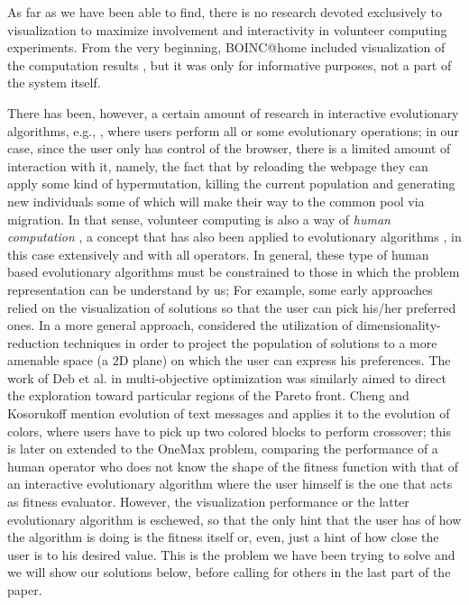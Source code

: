 \documentclass{sig-alternate}
\begin{document}
As far as we have been able to find, there is no research devoted
exclusively to visualization to maximize involvement and interactivity
in volunteer computing experiments. From the very beginning,
BOINC@home included visualization of the computation results
\cite{anderson2006designing}, but it was only for informative
purposes, not a part of the system itself. 

There has been, however, a certain amount of research in interactive
evolutionary algorithms, e.g.,
\cite{takagi01interactive,parmee:human-centric2003,parmee08user-centric,badillo13usercentric},
where users perform all or some evolutionary
operations; in our case, since the
user only has control of the browser, there is a limited amount of
interaction with it, namely, the fact that by reloading the webpage they
can apply some kind of hypermutation, killing the current population and
generating new individuals some of which will make their way to the
common pool via migration. In that sense, volunteer computing is also
a way of {\em human computation} \cite{quinn2011human}, a concept that
has also been applied to evolutionary algorithms \cite{972056, Nickerson2013}, in
this case extensively and with all operators. In general, these type
of human based evolutionary algorithms must be constrained to those in
which the problem representation can be understand by us; 
For example, some early approaches 
\cite{Daw86} relied on the visualization of solutions so that the user can 
pick his/her preferred ones. In a more general approach, \cite{takagi-jcis2000} 
considered the utilization of dimensionality-reduction techniques in order
to project the population of solutions to a more amenable space (a 2D plane)
on which the user can express his preferences. The work of Deb et al. in
multi-objective optimization \cite{DC07,DK07} was similarly aimed to direct 
the exploration toward particular regions of the Pareto front.
Cheng and Kosorukoff \cite{cheng2004interactive} mention evolution of text messages and
applies it to the evolution of colors, where users have to pick up two
colored blocks to perform crossover; this is later on extended to the
OneMax problem, comparing the performance of a human operator who does
not know the shape of the fitness function with that of an interactive
evolutionary algorithm where the user himself is the one that acts as
fitness evaluator.
However, the visualization performance or the latter evolutionary algorithm is
eschewed, so that the only hint
that the user has of how the algorithm is doing is the fitness itself
or, even, just a hint of how close the user is to his desired
value. This is the problem we have been trying to solve and we will
show our solutions below, before calling for others in the last part
of the paper. 
\end{document}
